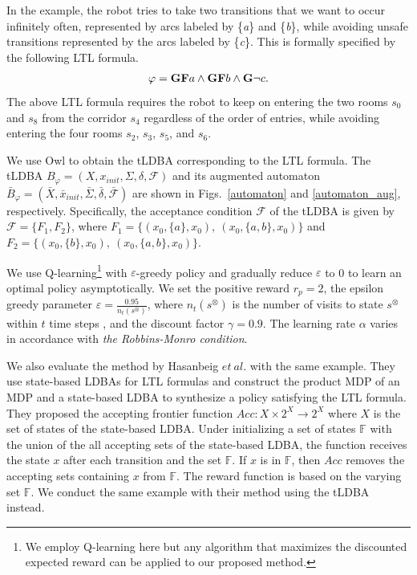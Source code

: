\documentclass[letterpaper, 10 pt, conference]{ieeeconf}  %
\begin{document}
In the example, the robot tries to take two transitions that we want to occur infinitely often, represented by arcs labeled by \{{\it a}\} and \{{\it b}\}, while avoiding unsafe transitions represented by the arcs labeled by \{{\it c}\}. This is formally specified by the following LTL formula.
\begin{align*}
  \varphi = \text{{\bf GF}}a \wedge \text{{\bf GF}}b \wedge \text{{\bf G}}\neg c.
\end{align*}
The above LTL formula requires the robot to keep on entering the two rooms $s_0$ and $s_8$ from the corridor $s_4$ regardless of the order of entries, while avoiding entering the four rooms $s_2$, $s_3$, $s_5$, and $s_6$.

We use Owl \cite{Owl} to obtain the tLDBA corresponding to the LTL formula.
The tLDBA $B_{\varphi} = (X, x_{init},\Sigma,\delta,\mathcal{F})$ and its augmented automaton $\bar{B}_{\varphi} = (\bar{X},\bar{x}_{init},\bar{\Sigma},\bar{\delta},\bar{\mathcal{F}})$ are shown in Figs.\ \ref{automaton} and \ref{automaton_aug}, respectively. Specifically, the acceptance condition ${\mathcal F}$ of the tLDBA is given by ${\mathcal F} = \{ F_1,F_2 \}$, where $F_1=\{ (x_0, \{ a \}, x_0),\ (x_0, \{ a,b \}, x_0) \}$ and $F_2 = \{ (x_0, \{ b \}, x_0),\ (x_0, \{ a,b \}, x_0) \}$.

We use Q-learning\footnote{We employ Q-learning here but any algorithm that maximizes the discounted expected reward can be applied to our proposed method.} with $\varepsilon$-greedy policy and gradually reduce $\varepsilon$ to 0 to learn an optimal policy asymptotically.
We set the positive reward $r_p = 2$, the epsilon greedy parameter $ \varepsilon = \frac{0.95}{n_t(s^{\otimes})}$, where $n_t(s^{\otimes})$ is the number of visits to state $s^{\otimes}$ within $t$ time steps \cite{Singh1998}, and the discount factor $\gamma = 0.9$. The learning rate $\alpha$ varies in accordance with {\it the Robbins-Monro condition}.

We also evaluate the method by Hasanbeig $et\ al.$\cite{HAK2019} with the same example. They use state-based LDBAs for LTL formulas and construct the product MDP of an MDP and a state-based LDBA to synthesize a policy satisfying the LTL formula. They proposed the accepting frontier function $Acc : X \times 2^X \rightarrow 2^X $ where $X$ is the set of states of the state-based LDBA. Under initializing a set of states $ \mathbb{F} $ with the union of the all accepting sets of the state-based LDBA, the function receives the state $x$ after each transition and the set $\mathbb{F}$. If $x$ is in $\mathbb{F}$, then $Acc$ removes the accepting sets containing $x$ from $\mathbb{F}$. The reward function is based on the varying set $\mathbb{F}$. We conduct the same example with their method using the tLDBA instead.
\end{document}

